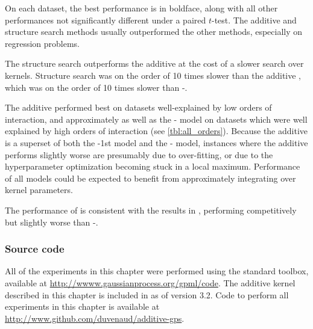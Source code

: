 On each dataset, the best performance is in boldface, along with all other performances not significantly different under a paired $t$-test.
The additive and structure search methods usually outperformed the other methods, especially on regression problems.


The structure search outperforms the additive \gp{} at the cost of a slower search over kernels.
Structure search was on the order of 10 times slower than the additive \gp{}, which was on the order of 10 times slower than \gp{}-\kSE{}.

The additive \gp{} performed best on datasets well-explained by low orders of interaction, and approximately as well as the \SE{}-\gp{} model on datasets which were well explained by high orders of interaction (see \cref{tbl:all_orders}).
Because the additive \gp{} is a superset of both the \gp{}-1st model and the \gp{}-\kSE{} model, instances where the additive \gp{} performs slightly worse are presumably due to over-fitting, or due to the hyperparameter optimization becoming stuck in a local maximum. %
Performance of all \gp{} models could be expected to benefit from approximately integrating over kernel parameters.

The performance of \HKL{} is consistent with the results in \citet{Bach_HKL}, performing competitively but slightly worse than \SE{}-\gp{}.


\subsubsection{Source code}

All of the experiments in this chapter were performed using the standard \GPML{} toolbox, available at \url{http://wwww.gaussianprocess.org/gpml/code}.
The additive kernel described in this chapter is included in \GPML{} as of version 3.2.
Code to perform all experiments in this chapter is available at \url{http://www.github.com/duvenaud/additive-gps}.





